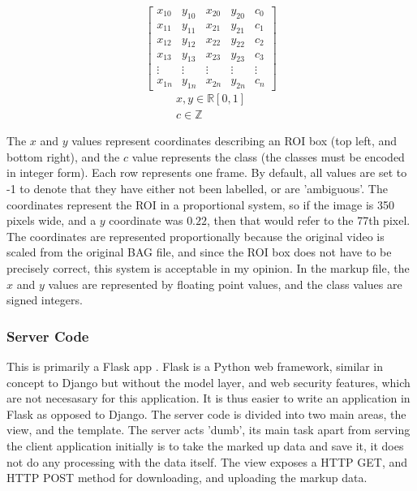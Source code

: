     \[
    \begin{bmatrix}
    x_{10} & y_{10} & x_{20} & y_{20} & c_{0} \\
    x_{11} & y_{11} & x_{21} & y_{21} & c_{1} \\
    x_{12} & y_{12} & x_{22} & y_{22} & c_{2} \\
    x_{13} & y_{13} & x_{23} & y_{23} & c_{3} \\
    \vdots & \vdots & \vdots & \vdots & \vdots\\
    x_{1n} & y_{1n} & x_{2n} & y_{2n} & c_{n} 
    \end{bmatrix}
    \]
    \begin{gather*}
    x, y \in \mathbb{R} [0, 1]\\
    c \in \mathbb{Z}
    \end{gather*}

    The $x$ and $y$ values represent coordinates describing an ROI box (top left, and bottom right), and the $c$ value represents the class (the classes must be encoded in integer form). Each row represents one frame. By default, all values are set to -1 to denote that they have either not been labelled, or are 'ambiguous'. The coordinates represent the ROI in a proportional system, so if the image is 350 pixels wide, and a $y$ coordinate was $0.22$, then that would refer to the 77th pixel. The coordinates are represented proportionally because the original video is scaled from the original BAG file, and since the ROI box does not have to be precisely correct, this system is acceptable in my opinion. In the markup file, the $x$ and $y$ values are represented by floating point values, and the class values are signed integers.

        \subsubsection{Server Code}
        This is primarily a Flask app \cite{flaskpocoo}. Flask is a Python web framework, similar in concept to Django but without the model layer, and web security features, which are not necesasary for this application. It is thus easier to write an application in Flask as opposed to Django. The server code is divided into two main areas, the view, and the template. The server acts 'dumb', its main task apart from serving the client application initially is to take the marked up data and save it, it does not do any processing with the data itself. The view exposes a HTTP GET, and HTTP POST method for downloading, and uploading the markup data.

